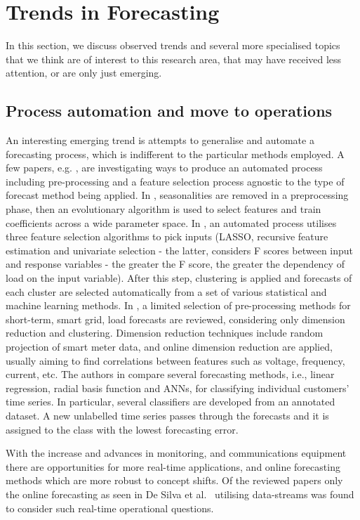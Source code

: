 \section{Trends in Forecasting}
\label{sec_trends_special_topics}

In this section, we discuss observed trends and several more specialised topics that we think are of interest to this research area, that may have received less attention, or are only just emerging.


\subsection{Process automation and move to operations}
An interesting emerging trend is attempts to generalise and automate a forecasting process, which is indifferent to the particular methods employed. A few papers, e.g. \cite{hoverstad2015stl,opera2019mla}, are investigating ways to produce an automated process including pre-processing and a feature selection process agnostic to the type of forecast method being applied. In \cite{hoverstad2015stl}, seasonalities are removed in a preprocessing phase, then an evolutionary algorithm is used to select features and train coefficients across a wide parameter space. In \cite{opera2019mla}, an automated process utilises three feature selection algorithms to pick inputs (LASSO, recursive feature estimation and univariate selection - the latter, considers F scores between input and response variables - the greater the F score, the greater the dependency of load on the input variable). After this step, clustering is applied and forecasts of each cluster are selected automatically from a set of various statistical and machine learning methods. In \cite{diamantoulakis2015bda}, a limited selection of pre-processing methods for short-term, smart grid, load forecasts are reviewed, considering only dimension reduction and clustering. Dimension reduction techniques include random projection of smart meter data, and online dimension reduction are applied, usually aiming to find correlations between features such as voltage, frequency, current, etc. The authors in \cite{tornai2016cfc} compare several forecasting methods, i.e., linear regression, radial basis function and ANNs, for classifying individual customers' time series. In particular, several classifiers are developed from an annotated dataset. A new unlabelled time series passes through the forecasts and it is assigned to the class with the lowest forecasting error.

With the increase and advances in monitoring, and communications equipment there are opportunities for more real-time applications, and online forecasting methods which are more robust to concept shifts. Of the reviewed papers only the online forecasting as seen in De Silva et al.~\cite{desilva2011ipc} utilising data-streams was found to consider such real-time operational questions. 

